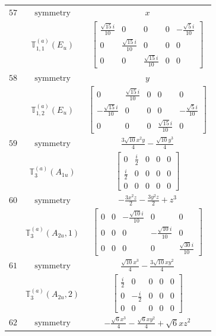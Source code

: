 \documentclass[fleqn,8pt,landscape]{jsarticle}
\begin{document}
\begin{longtable}{ccc}
$ 57 $ & $ \text{symmetry} $ & $ x $ \\
$  $ & $ \mathbb{T}_{1,1}^{(a)}(E_{u}) $ & $ \begin{bmatrix} \frac{\sqrt{15} i}{10} & 0 & 0 & 0 & - \frac{\sqrt{5} i}{10} \\ 0 & \frac{\sqrt{15} i}{10} & 0 & 0 & 0 \\ 0 & 0 & \frac{\sqrt{15} i}{10} & 0 & 0 \end{bmatrix} $ \\ \hline
$ 58 $ & $ \text{symmetry} $ & $ y $ \\
$  $ & $ \mathbb{T}_{1,2}^{(a)}(E_{u}) $ & $ \begin{bmatrix} 0 & \frac{\sqrt{15} i}{10} & 0 & 0 & 0 \\ - \frac{\sqrt{15} i}{10} & 0 & 0 & 0 & - \frac{\sqrt{5} i}{10} \\ 0 & 0 & 0 & \frac{\sqrt{15} i}{10} & 0 \end{bmatrix} $ \\ \hline
$ 59 $ & $ \text{symmetry} $ & $ \frac{3 \sqrt{10} x^{2} y}{4} - \frac{\sqrt{10} y^{3}}{4} $ \\
$  $ & $ \mathbb{T}_{3}^{(a)}(A_{1u}) $ & $ \begin{bmatrix} 0 & \frac{i}{2} & 0 & 0 & 0 \\ \frac{i}{2} & 0 & 0 & 0 & 0 \\ 0 & 0 & 0 & 0 & 0 \end{bmatrix} $ \\ \hline
$ 60 $ & $ \text{symmetry} $ & $ - \frac{3 x^{2} z}{2} - \frac{3 y^{2} z}{2} + z^{3} $ \\
$  $ & $ \mathbb{T}_{3}^{(a)}(A_{2u},1) $ & $ \begin{bmatrix} 0 & 0 & - \frac{\sqrt{10} i}{10} & 0 & 0 \\ 0 & 0 & 0 & - \frac{\sqrt{10} i}{10} & 0 \\ 0 & 0 & 0 & 0 & \frac{\sqrt{30} i}{10} \end{bmatrix} $ \\ \hline
$ 61 $ & $ \text{symmetry} $ & $ \frac{\sqrt{10} x^{3}}{4} - \frac{3 \sqrt{10} x y^{2}}{4} $ \\
$  $ & $ \mathbb{T}_{3}^{(a)}(A_{2u},2) $ & $ \begin{bmatrix} \frac{i}{2} & 0 & 0 & 0 & 0 \\ 0 & - \frac{i}{2} & 0 & 0 & 0 \\ 0 & 0 & 0 & 0 & 0 \end{bmatrix} $ \\ \hline
$ 62 $ & $ \text{symmetry} $ & $ - \frac{\sqrt{6} x^{3}}{4} - \frac{\sqrt{6} x y^{2}}{4} + \sqrt{6} x z^{2} $ \\

\end{longtable}
\end{document}
